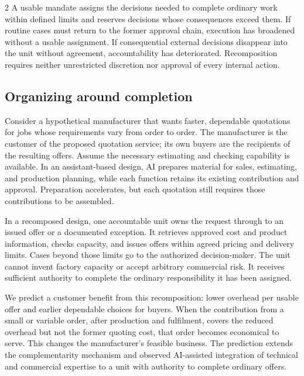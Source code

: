 \begin{multicols}{2}
A usable mandate assigns the decisions needed to complete ordinary work
within defined limits and reserves decisions whose consequences exceed
them. If routine cases must return to the former approval chain,
execution has broadened without a usable assignment. If consequential
external decisions disappear into the unit without agreement,
accountability has deteriorated. Recomposition requires neither
unrestricted discretion nor approval of every internal action.

\subsection{Organizing around
completion}\label{organizing-around-completion}

Consider a hypothetical manufacturer that wants faster, dependable
quotations for jobs whose requirements vary from order to order. The
manufacturer is the customer of the proposed quotation service; its own
buyers are the recipients of the resulting offers. Assume the necessary
estimating and checking capability is available. In an assistant-based
design, AI prepares material for sales, estimating, and production
planning, while each function retains its existing contribution and
approval. Preparation accelerates, but each quotation still requires
those contributions to be assembled.

In a recomposed design, one accountable unit owns the request through to
an issued offer or a documented exception. It retrieves approved cost
and product information, checks capacity, and issues offers within
agreed pricing and delivery limits. Cases beyond those limits go to the
authorized decision-maker. The unit cannot invent factory capacity or
accept arbitrary commercial risk. It receives sufficient authority to
complete the ordinary responsibility it has been assigned.

We predict a customer benefit from this recomposition: lower overhead
per usable offer and earlier dependable choices for buyers. When the
contribution from a small or variable order, after production and
fulfilment, covers the reduced overhead but not the former quoting cost,
that order becomes economical to serve. This changes the manufacturer's
feasible business. The prediction extends the complementarity mechanism
\citep{milgrom1995complementarities} and observed AI-assisted
integration of technical and commercial expertise
\citep{dellacqua2026teammate} to a unit with authority to complete
ordinary offers.


\end{multicols}
